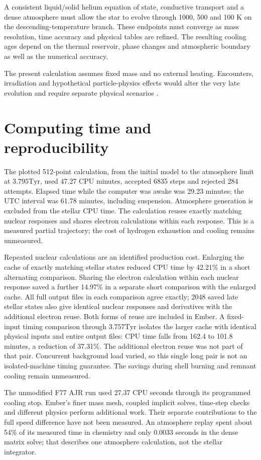 \documentclass[11pt,letterpaper]{article}
\newcommand{\Tyr}{\mathrm{Tyr}}
\begin{document}
A consistent liquid/solid helium equation of state, conductive
transport and a dense atmosphere must allow the star to evolve through
1000, 500 and 100 K on the descending-temperature branch. These endpoints must
converge as mass resolution, time accuracy and physical tables are refined.
The resulting cooling ages depend on the thermal reservoir, phase changes
and atmospheric boundary as well as the numerical accuracy.

The present calculation assumes fixed mass and no external heating.
Encounters, irradiation and hypothetical particle-physics effects would alter
the very late evolution and require separate physical scenarios \cite{adams97}.

\section{Computing time and reproducibility}
The plotted 512-point calculation, from the initial model to the atmosphere
limit at $3.795\Tyr$, used 47.27 CPU minutes, accepted 6835 steps and rejected
284 attempts. Elapsed time while the computer was awake was 29.23 minutes;
the UTC interval was 61.78 minutes, including suspension. Atmosphere generation
is excluded from the stellar CPU time. The calculation reuses exactly matching nuclear responses and shares
electron calculations within each response. This is a measured partial trajectory; the cost of hydrogen
exhaustion and cooling remains unmeasured.

Repeated nuclear calculations are an identified production cost. Enlarging the
cache of exactly matching stellar states reduced CPU time by 42.21\% in a
short alternating comparison. Sharing the electron calculation within each
nuclear response saved a further 14.97\% in a separate short comparison with
the enlarged cache. All full output files in each comparison agree exactly;
2048 saved late stellar states also give identical nuclear responses and
derivatives with the additional electron reuse. Both forms of reuse are included in Ember.
A fixed-input timing comparison through $3.757\Tyr$ isolates the larger cache with identical
physical inputs and entire output files: CPU time falls from 162.4 to 101.8
minutes, a reduction of 37.31\%. The additional electron reuse was not part
of that pair. Concurrent background load varied, so this single long pair is not
an isolated-machine timing guarantee. The savings during shell burning and
remnant cooling remain unmeasured.

The unmodified F77 AJR run used 27.37 CPU seconds through its programmed
cooling stop. Ember's finer mass mesh, coupled implicit solves, time-step checks
and different physics perform additional work. Their separate contributions
to the full speed difference have not been measured. An atmosphere
replay spent about 54\% of its measured time in chemistry and only 0.0033 seconds
in the dense matrix solve; that describes one atmosphere calculation, not
the stellar integrator.
\end{document}
